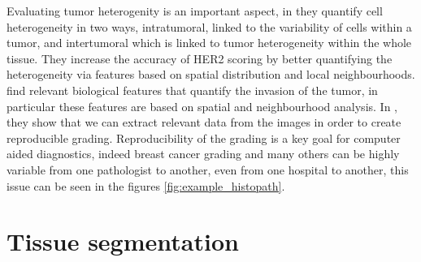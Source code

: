 \documentclass[a4paper,10pt,twocolumn]{article}
\begin{document}
 Evaluating tumor heterogenity is an important aspect, in \citet{potts2012evaluating} 
 they quantify cell heterogeneity in two ways, intratumoral, linked to the variability of cells 
 within a tumor, and intertumoral which is linked to tumor heterogeneity within the whole 
 tissue. They increase the accuracy of HER2 scoring by better quantifying the heterogeneity 
 via features based on spatial distribution and local neighbourhoods. 
 \citet{harder2016cooccurence} find relevant biological features that quantify the invasion of 
 the tumor, in particular these features are based on spatial and neighbourhood analysis. In 
 \citet{petushi2006large}, they show that we can extract relevant data from the images in 
 order to create reproducible grading. Reproducibility of the grading is a key goal for computer 
 aided diagnostics, indeed breast cancer grading and many others can be highly variable from 
 one pathologist to another, even from one hospital to another, this issue can be seen in the 
 figures \ref{fig:example_histopath}. 

\section{Tissue segmentation}
\end{document}
